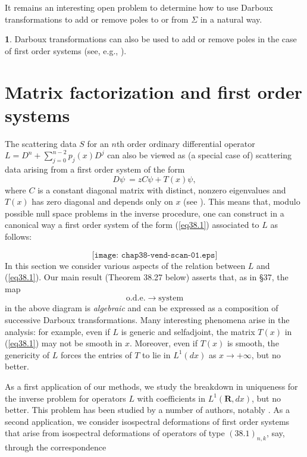 \documentclass{surv-l}
\theoremstyle{plain}
\theoremstyle{definition}
\newtheorem{remark}[theorem]{\sc{Remark}}
\numberwithin{equation}{chapter}
\begin{document}
It remains an interesting open problem to determine how to use Darboux transformations to add or remove poles to or from $\Sigma$ in a natural way.

\begin{remark}\label{rem37.52}
Darboux transformations can also be used to add or remove poles in the case of first order systems (see, e.g., \cite{Sa, SZ1, SZ2, BC3}).
\end{remark}

\section{Matrix factorization and first order systems}\label{sec38}  The scattering data $S$ for an $n$th order ordinary differential operator $L=D^{n}+\sum_{j=0}^{n-2}p_{j}(x)D^{j}$ can also be viewed as (a special case of) scattering data arising from a first order system of the form
\begin{equation}\label{eq38.1}
 D\psi\ =zC\psi+T(x)\psi,
\end{equation}
where $C$ is a constant diagonal matrix with distinct, nonzero eigenvalues and $T(x)$ has zero diagonal and depends only on $x$ (see \cite{BC1}). This means that, modulo possible null space problems in the inverse procedure, one can construct in a canonical way a first order system of the form (\ref{eq38.1}) associated to $L$ as follows:

\begin{equation*}
\texttt{[image: chap38-vend-scan-01.eps]}
\end{equation*}
In this section we consider various aspects of the relation between $L$ and (\ref{eq38.1}). Our main result (Theorem 38.27 below) asserts that, as in \S 37, the map
\begin{equation*}
\mathrm{o.d.e}. \rightarrow \mathrm{system}
\end{equation*}
in the above diagram is \emph{algebraic} and can be expressed as a composition of successive Darboux transformations. Many interesting phenomena arise in the analysis: for example, even if $L$ is generic and selfadjoint, the matrix $T(x)$ in (\ref{eq38.1}) may not be smooth in $x$. Moreover, even if $T(x)$ is smooth, the genericity of $L$ forces the entries of $T$ to lie in $L^{1}(dx)$ as $ x\rightarrow+\infty$, but no better.

As a first application of our methods, we study the breakdown in uniqueness for the inverse problem for operators $L$ with coefficients in $L^{1}(\textbf{R}, dx)$, but no better. This problem has been studied by a number of authors, notably \cite{ADM, AN, DS}. As a second application, we consider isospectral deformations of first order systems that arise from isospectral deformations of operators of type $\mathrm{(38.1)}_{n,k}$, say, through the correspondence
\end{document}
